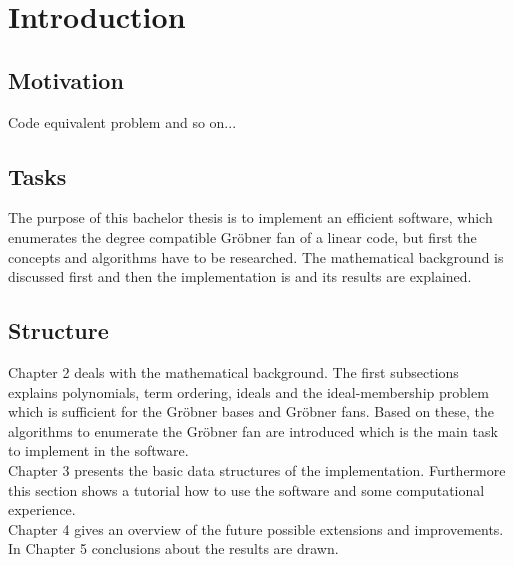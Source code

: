 \section{Introduction}

\subsection{Motivation}
Code equivalent problem and so on...

\subsection{Tasks}
The purpose of this bachelor thesis is to implement an efficient software, which enumerates the degree compatible Gröbner fan of a linear code, but first the concepts and algorithms have to be researched. The mathematical background is discussed first and then the implementation is and its results are explained. 


\subsection{Structure}
Chapter 2 deals with the mathematical background. The first subsections explains polynomials, term ordering, ideals and the ideal-membership problem which is sufficient for the Gröbner bases and Gröbner fans. Based on these, the algorithms to enumerate the Gröbner fan are introduced which is the main task to implement in the software.\\
Chapter 3 presents the basic data structures of the implementation. Furthermore this section shows a tutorial how to use the software and some computational experience.\\
Chapter 4 gives an overview of the future possible extensions and improvements.\\
In Chapter 5 conclusions about the results are drawn.
\newpage